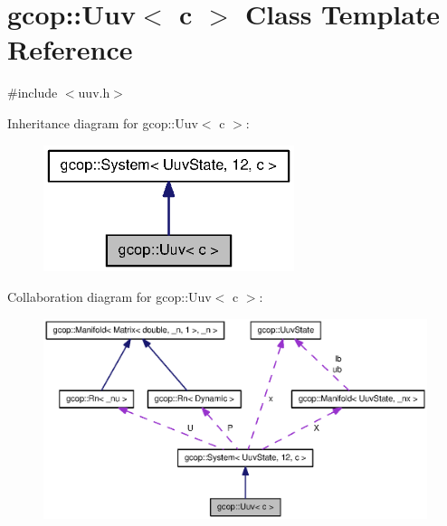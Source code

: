 \section{gcop\-:\-:\-Uuv$<$ c $>$ \-Class \-Template \-Reference}
\label{classgcop_1_1Uuv}


{\ttfamily \#include $<$uuv.\-h$>$}



\-Inheritance diagram for gcop\-:\-:\-Uuv$<$ c $>$\-:
\nopagebreak
\begin{figure}[H]
\begin{center}
\leavevmode
\includegraphics[width=208pt]{classgcop_1_1Uuv__inherit__graph}
\end{center}
\end{figure}


\-Collaboration diagram for gcop\-:\-:\-Uuv$<$ c $>$\-:
\nopagebreak
\begin{figure}[H]
\begin{center}
\leavevmode
\includegraphics[width=350pt]{classgcop_1_1Uuv__coll__graph}
\end{center}
\end{figure}
